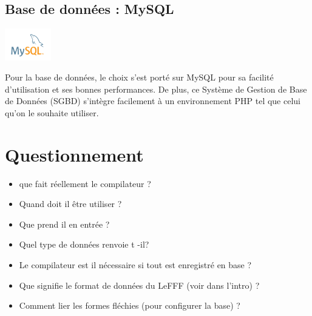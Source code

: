 \documentclass[12pt,a4paper]{article}
\begin{document}
\subsection{Base de données : MySQL}
\begin{center}
  \includegraphics[width=2cm]{img/mysql.png}
\end{center}
Pour la base de données, le choix s'est porté sur MySQL pour sa facilité d'utilisation et ses bonnes performances. 
De plus, ce Système de Gestion de Base de Données (SGBD) s'intègre facilement à un environnement PHP tel que celui qu'on le souhaite utiliser.


\section{Questionnement}
\begin{itemize}  
  \item que fait réellement le compilateur ?
  \item Quand doit il être utiliser ?
  \item Que prend il en entrée ?
  \item Quel type de données renvoie t -il?
  \item Le compilateur est il nécessaire si tout est enregistré en base ?
  \item Que signifie le format de données du LeFFF (voir dans l'intro) ?
  \item Comment lier les formes fléchies (pour configurer la base) ?
\end{itemize}
\end{document}
